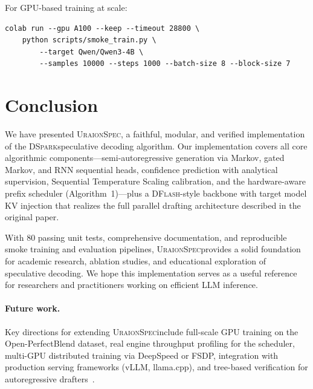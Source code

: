 \documentclass[11pt,a4paper]{article}
\newcommand{\UraionSpec}{\textsc{UraionSpec}}
\newcommand{\DSpark}{\textsc{DSpark}}
\newcommand{\DFlash}{\textsc{DFlash}}
\begin{document}
For GPU-based training at scale:
\begin{verbatim}
colab run --gpu A100 --keep --timeout 28800 \
    python scripts/smoke_train.py \
        --target Qwen/Qwen3-4B \
        --samples 10000 --steps 1000 --batch-size 8 --block-size 7
\end{verbatim}

\section{Conclusion}
\label{sec:conclusion}

We have presented \UraionSpec, a faithful, modular, and verified
implementation of the \DSpark speculative decoding algorithm. Our
implementation covers all core algorithmic components---semi-autoregressive
generation via Markov, gated Markov, and RNN sequential heads, confidence
prediction with analytical supervision, Sequential Temperature Scaling
calibration, and the hardware-aware prefix scheduler (Algorithm~1)---plus
a \DFlash-style backbone with target model KV injection that realizes the
full parallel drafting architecture described in the original paper.

With 80 passing unit tests, comprehensive documentation, and reproducible
smoke training and evaluation pipelines, \UraionSpec provides a solid
foundation for academic research, ablation studies, and educational
exploration of speculative decoding. We hope this implementation serves as a
useful reference for researchers and practitioners working on efficient LLM
inference.

\paragraph{Future work.}
Key directions for extending \UraionSpec include full-scale GPU training on
the Open-PerfectBlend dataset, real engine throughput profiling for the
scheduler, multi-GPU distributed training via DeepSpeed or FSDP, integration
with production serving frameworks (vLLM, llama.cpp), and tree-based
verification for autoregressive drafters~\cite{spectrindecoding}.
\end{document}
